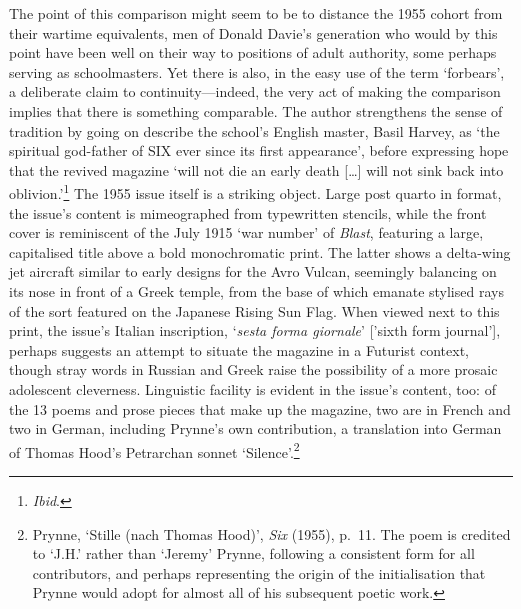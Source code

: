 \documentclass[]{article}
\begin{document}
The point of this comparison might seem to be to distance the 1955
cohort from their wartime equivalents, men of Donald Davie's generation
who would by this point have been well on their way to positions of
adult authority, some perhaps serving as schoolmasters. Yet there is
also, in the easy use of the term `forbears', a deliberate claim to
continuity---indeed, the very act of making the comparison implies that
there is something comparable. The author strengthens the sense of
tradition by going on describe the school's English master, Basil
Harvey, as `the spiritual god-father of SIX ever since its first
appearance', before expressing hope that the revived magazine `will not
die an early death {[}\ldots{}{]} will not sink back into
oblivion.'\footnote{\emph{Ibid}.} The 1955 issue itself is a striking
object. Large post quarto in format, the issue's content is mimeographed
from typewritten stencils, while the front cover is reminiscent of the
July 1915 `war number' of \emph{Blast}, featuring a large, capitalised
title above a bold monochromatic print. The latter shows a delta-wing
jet aircraft similar to early designs for the Avro Vulcan, seemingly
balancing on its nose in front of a Greek temple, from the base of which
emanate stylised rays of the sort featured on the Japanese Rising Sun
Flag. When viewed next to this print, the issue's Italian inscription,
`\emph{sesta forma giornale}' {[}'sixth form journal'{]}, perhaps
suggests an attempt to situate the magazine in a Futurist context,
though stray words in Russian and Greek raise the possibility of a more
prosaic adolescent cleverness. Linguistic facility is evident in the
issue's content, too: of the 13 poems and prose pieces that make up the
magazine, two are in French and two in German, including Prynne's own
contribution, a translation into German of Thomas Hood's Petrarchan
sonnet `Silence'.\footnote{Prynne, `Stille (nach Thomas Hood)',
  \emph{Six} (1955), p.~11. The poem is credited to `J.H.' rather than
  `Jeremy' Prynne, following a consistent form for all contributors, and
  perhaps representing the origin of the initialisation that Prynne
  would adopt for almost all of his subsequent poetic work.}
\end{document}
